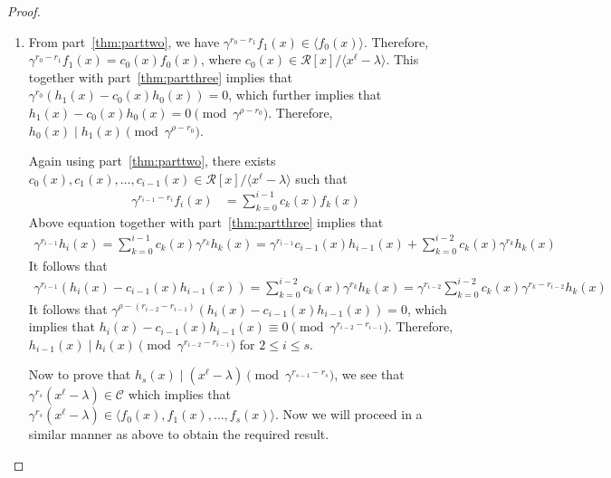 \documentclass[12pt,a4paper]{article}
\begin{document}
\begin{proof}
\begin{enumerate}
        Now we prove the result for $i=k$. We have $\gamma^{r_{i-1}-r_i}f_i(x) \in \langle f_0(x), f_1(x), \dots, f_{i-1}(x) \rangle$ by part~\ref{thm:parttwo}. Therefore, there exist polynomials $c_0(x),c_1(x),\dots,c_{k-1}(x)$ in $ \mathcal{R}[x]/ \langle x^{\ell}-\lambda \rangle$ such that
        \begin{align*}
            \gamma^{r_{k-1}-r_k}f_k(x) = \sum_{i=0}^{k-1}c_i(x)f_i(x)
            =\sum_{i=0}^{k-1}\gamma^{r_i}c_i(x)h_i(x)=\gamma^{r_{k-1}}\sum_{i=0}^{k-1}\gamma^{r_i-r_{k-1}}c_k(x)h_k(x)
        \end{align*}
        
        It follows that $\gamma^{\rho-r_k}f_k(x)=0$ and therefore, $f_k(x)=\gamma^{r_k}h_k(x)$, where $h_k(x)$ is a monic polynomial.
        
        Hence, $f_i(x)=\gamma^{r_i}h_i(x)$, where $h_i(x)$ is a monic polynomial for $0 \le i \le s$, by mathematical induction.
        
        \item From part~\ref{thm:parttwo}, we have $\gamma^{r_0-r_1}f_1(x) \in \langle f_0(x) \rangle$. Therefore, $\gamma^{r_0-r_1}f_1(x)=c_0(x)f_0(x)$, where $c_0(x) \in \mathcal{R}[x]/\langle x^{\ell}-\lambda \rangle$. This together with part~\ref{thm:partthree} implies that $\gamma^{r_0}(h_1(x)-c_0(x)h_0(x))=0$, which further implies that $h_1(x)-c_0(x)h_0(x)=0 \pmod{\gamma^{\rho-r_0}}$. Therefore, $h_0(x) \mid h_1(x) \pmod{\gamma^{\rho-r_0}}$.

        Again using part~\ref{thm:parttwo}, there exists $c_0(x),c_1(x), \dots, c_{i-1}(x) \in \mathcal{R}[x]/\langle x^{\ell}-\lambda\rangle$ such that
        \begin{align*}
            \gamma^{r_{i-1}-r_i}f_i(x)&=\sum_{k=0}^{i-1}c_k(x)f_k(x)
        \end{align*}
        Above equation together with part~\ref{thm:partthree} implies that
        \begin{align*}
            \gamma^{r_{i-1}}h_i(x)=\sum_{k=0}^{i-1}c_k(x)\gamma^{r_k}h_k(x)=\gamma^{r_{i-1}}c_{i-1}(x)h_{i-1}(x)+\sum_{k=0}^{i-2}c_k(x)\gamma^{r_k}h_k(x)
        \end{align*}
        It follows that
        \begin{align*}
            \gamma^{r_{i-1}}(h_i(x)-c_{i-1}(x)h_{i-1}(x))=\sum_{k=0}^{i-2}c_k(x)\gamma^{r_k}h_k(x)=\gamma^{r_{i-2}}\sum_{k=0}^{i-2}c_k(x)\gamma^{r_k-r_{i-2}}h_k(x)
        \end{align*}
           It follows that $\gamma^{\rho-(r_{i-2}-r_{i-1})}(h_i(x)-c_{i-1}(x)h_{i-1}(x))=0$, which implies that $h_i(x)-c_{i-1}(x)h_{i-1}(x)\equiv 0 \pmod{\gamma^{r_{i-2}-r_{i-1}}}$. Therefore, $h_{i-1}(x) \mid h_i(x) \pmod{\gamma^{r_{i-2}-r_{i-1}}}$ for $2 \le i \le s$.

        Now to prove that $h_s(x) \mid (x^{\ell}-\lambda) \pmod{\gamma^{r_{s-1}-r_s}}$, we see that $\gamma^{r_s}(x^{\ell}-\lambda) \in \mathcal{C}$ which implies that $\gamma^{r_s}(x^{\ell}-\lambda) \in \langle f_0(x),f_1(x), \dots, f_s(x) \rangle$. Now we will proceed in a similar manner as above to obtain the required result.
    \end{enumerate}
\end{proof}
\end{document}
